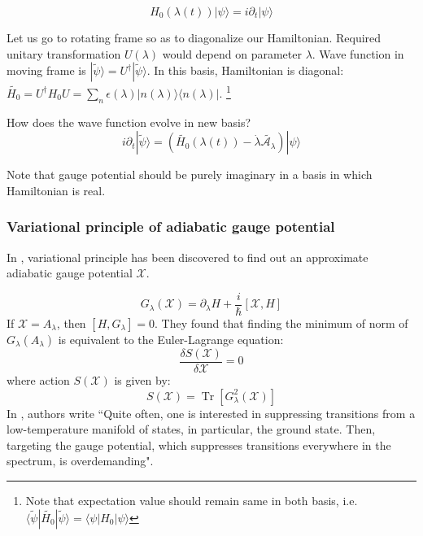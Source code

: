 \documentclass[11pt,a4paper]{article}
\DeclareMathOperator{\Tr}{Tr}
\begin{document}
\begin{equation}
H_0(\lambda (t)) |\psi \rangle= i \partial_t|\psi \rangle
\end{equation}

Let us go to rotating frame so as to diagonalize our Hamiltonian. Required unitary transformation $U(\lambda)$ would depend on parameter $\lambda$. Wave function in moving frame is $|\tilde{\psi}  \rangle = U^{\dagger} |\tilde{\psi}  \rangle$. In this basis, Hamiltonian is diagonal:
$\tilde{H_0}= U^{\dagger} H_0 U = \sum_n \epsilon (\lambda)  |n (\lambda)\rangle \langle  n (\lambda) |$. \footnote{Note that expectation value should remain same in both basis, i.e.$ \langle \tilde{\psi} | \tilde{H_0}  |\tilde{\psi}  \rangle= \langle{\psi} | {H_0}  |{\psi}  \rangle$}

How does the wave function evolve in new basis?
\begin{equation}
 i \partial_t|\tilde{\psi} \rangle=(\tilde{H_0
 }(\lambda (t)) - \dot{\lambda} \tilde{\mathcal{A_\lambda}}) |\psi \rangle
\end{equation}

Note that gauge potential should be purely imaginary in a basis in which Hamiltonian is real. 

\subsubsection{Variational principle  of adiabatic gauge potential}
In \cite{sels2017minimizing}, variational principle has been discovered to find out an approximate  adiabatic  gauge potential $\mathcal{X}$. 

\begin{equation}
G_{\lambda}(\mathcal{X} )= \partial_{\lambda} H + \dfrac{i}{\hbar} [\mathcal{X}, H] 
\end{equation}
If $\mathcal{X}= A_{\lambda}$, then $[H,G_{\lambda}]=0 $. They found that finding the minimum of norm of $G_{\lambda}( A_{\lambda})$ is equivalent to the Euler-Lagrange equation:
\begin{equation}
\dfrac{\delta S(\mathcal{X})}{\delta \mathcal{X}}=0
\end{equation}
where action $S( \mathcal{X})$ is given by:
\begin{equation}
S( \mathcal{X})= \Tr[G_{\lambda}^2( \mathcal{X})]
\end{equation}
In \cite{sels2017minimizing}, authors write ``Quite often, one is interested in suppressing transitions from a low-temperature manifold of states, in particular, the ground
state. Then, targeting the gauge potential, which suppresses transitions everywhere in the spectrum, is overdemanding".
\end{document}
